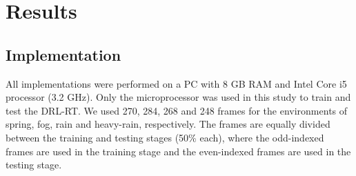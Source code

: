 \documentclass{svproc}
\begin{document}
	\section{Results}
	\subsection{Implementation} 
	All implementations were performed on a PC with 8 GB RAM and Intel Core i5 processor (3.2 GHz). Only the microprocessor was used in this study to train and test the DRL-RT. We used 270, 284, 268 and 248 frames for the environments of spring, fog, rain and heavy-rain, respectively. The frames are equally divided between the training and testing stages (50\% each), where the odd-indexed frames are used in the training stage and the even-indexed frames are used in the testing stage.
\end{document}
